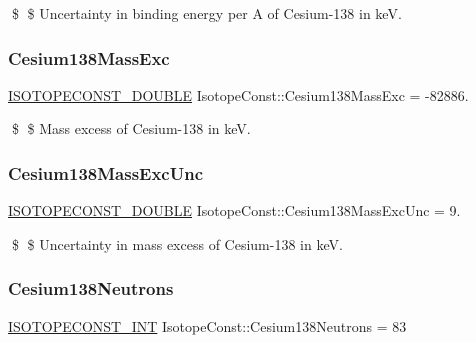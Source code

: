 \$ \$ Uncertainty in binding energy per A of Cesium-\/138 in keV. \mbox{\label{group___isotope_const-_cesium-_cs138_gaa46353b2bd36bf726cd117fc94fae71e}} 
\subsubsection{\texorpdfstring{Cesium138\+Mass\+Exc}{Cesium138MassExc}}
{\footnotesize\ttfamily \mbox{\hyperlink{group___isotope_const-_macros_ga8f45a7272ce02c0b4c65c44636ed719a}{I\+S\+O\+T\+O\+P\+E\+C\+O\+N\+S\+T\+\_\+\+D\+O\+U\+B\+LE}} Isotope\+Const\+::\+Cesium138\+Mass\+Exc = -\/82886.}

\$ \$ Mass excess of Cesium-\/138 in keV. \mbox{\label{group___isotope_const-_cesium-_cs138_gaa1f5723f9c01044432816cc161d9fa25}} 
\subsubsection{\texorpdfstring{Cesium138\+Mass\+Exc\+Unc}{Cesium138MassExcUnc}}
{\footnotesize\ttfamily \mbox{\hyperlink{group___isotope_const-_macros_ga8f45a7272ce02c0b4c65c44636ed719a}{I\+S\+O\+T\+O\+P\+E\+C\+O\+N\+S\+T\+\_\+\+D\+O\+U\+B\+LE}} Isotope\+Const\+::\+Cesium138\+Mass\+Exc\+Unc = 9.}

\$ \$ Uncertainty in mass excess of Cesium-\/138 in keV. \mbox{\label{group___isotope_const-_cesium-_cs138_gab0529432e6bfa13c0c226cb90f49e92a}} 
\subsubsection{\texorpdfstring{Cesium138\+Neutrons}{Cesium138Neutrons}}
{\footnotesize\ttfamily \mbox{\hyperlink{group___isotope_const-_macros_ga5f18360b3e99483a35c32d789e62621c}{I\+S\+O\+T\+O\+P\+E\+C\+O\+N\+S\+T\+\_\+\+I\+NT}} Isotope\+Const\+::\+Cesium138\+Neutrons = 83}

